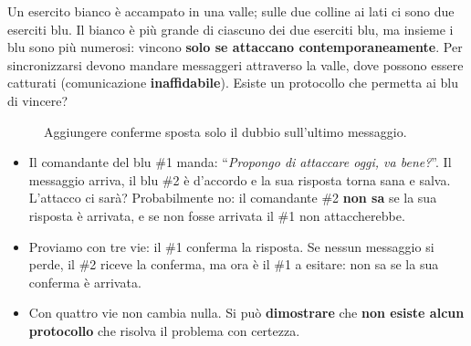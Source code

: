 Un esercito bianco è accampato in una valle; sulle due colline ai lati ci sono due eserciti blu. Il
bianco è più grande di ciascuno dei due eserciti blu, ma insieme i blu sono più numerosi: vincono
\textbf{solo se attaccano contemporaneamente}. Per sincronizzarsi devono mandare messaggeri attraverso la
valle, dove possono essere catturati (comunicazione \textbf{inaffidabile}). Esiste un protocollo che permetta
ai blu di vincere?

\begin{figure}[H]
\centering
{}
\caption{Aggiungere conferme sposta solo il dubbio sull'ultimo messaggio.}
\end{figure}

\begin{itemize}
    \item Il comandante del blu \#1 manda: ``\emph{Propongo di attaccare oggi, va bene?}''. Il messaggio arriva, il
          blu \#2 è d'accordo e la sua risposta torna sana e salva. L'attacco ci sarà? Probabilmente no: il
          comandante \#2 \textbf{non sa} se la sua risposta è arrivata, e se non fosse arrivata il \#1 non attaccherebbe.
    \item Proviamo con tre vie: il \#1 conferma la risposta. Se nessun messaggio si perde, il \#2 riceve la conferma,
          ma ora è il \#1 a esitare: non sa se la sua conferma è arrivata.
    \item Con quattro vie non cambia nulla. Si può \textbf{dimostrare} che \textbf{non esiste alcun protocollo} che
          risolva il problema con certezza.
\end{itemize}

